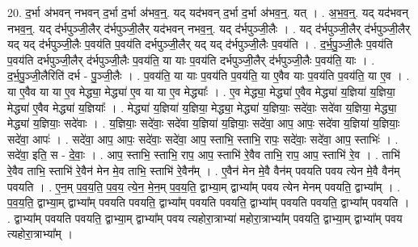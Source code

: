\documentclass[17pt]{extarticle}
\begin{document}
20. द॒र्भा अ॑भवन् नभवन् द॒र्भा द॒र्भा अ॑भव॒न्॒. यद् यद॑भवन् द॒र्भा द॒र्भा अ॑भव॒न्॒. यत् । . अ॒भ॒व॒न्॒. यद् यद॑भवन् नभव॒न्॒. यद् द॑र्भपुञ्जी॒लैर् द॑र्भपुञ्जी॒लैर् यद॑भवन् नभव॒न्॒. यद् द॑र्भपुञ्जी॒लैः । . यद् द॑र्भपुञ्जी॒लैर् द॑र्भपुञ्जी॒लैर् यद् यद् द॑र्भपुञ्जी॒लैः प॒वय॑ति प॒वय॑ति दर्भपुञ्जी॒लैर् यद् यद् द॑र्भपुञ्जी॒लैः प॒वय॑ति । . द॒र्भ॒पु॒ञ्जी॒लैः प॒वय॑ति प॒वय॑ति दर्भपुञ्जी॒लैर् द॑र्भपुञ्जी॒लैः प॒वय॑ति॒ या याः प॒वय॑ति दर्भपुञ्जी॒लैर् द॑र्भपुञ्जी॒लैः प॒वय॑ति॒ याः । . द॒र्भ॒पु॒ञ्जी॒लैरिति॑ दर्भ - पु॒ञ्जी॒लैः । . प॒वय॑ति॒ या याः प॒वय॑ति प॒वय॑ति॒ या ए॒वैव याः प॒वय॑ति प॒वय॑ति॒ या ए॒व । . या ए॒वैव या या ए॒व मेद्ध्या॒ मेद्ध्या॑ ए॒व या या ए॒व मेद्ध्याः᳚ । . ए॒व मेद्ध्या॒ मेद्ध्या॑ ए॒वैव मेद्ध्या॑ य॒ज्ञिया॑ य॒ज्ञिया॒ मेद्ध्या॑ ए॒वैव मेद्ध्या॑ य॒ज्ञियाः᳚ । . मेद्ध्या॑ य॒ज्ञिया॑ य॒ज्ञिया॒ मेद्ध्या॒ मेद्ध्या॑ य॒ज्ञियाः॒ सदे॑वाः॒ सदे॑वा य॒ज्ञिया॒ मेद्ध्या॒ मेद्ध्या॑ य॒ज्ञियाः॒ सदे॑वाः । . य॒ज्ञियाः॒ सदे॑वाः॒ सदे॑वा य॒ज्ञिया॑ य॒ज्ञियाः॒ सदे॑वा॒ आप॒ आपः॒ सदे॑वा य॒ज्ञिया॑ य॒ज्ञियाः॒ सदे॑वा॒ आपः॑ । . सदे॑वा॒ आप॒ आपः॒ सदे॑वाः॒ सदे॑वा॒ आप॒ स्ताभि॒ स्ताभि॒ रापः॒ सदे॑वाः॒ सदे॑वा॒ आप॒ स्ताभिः॑ । . सदे॑वा॒ इति॒ स - दे॒वाः॒ । . आप॒ स्ताभि॒ स्ताभि॒ राप॒ आप॒ स्ताभि॑ रे॒वैव ताभि॒ राप॒ आप॒ स्ताभि॑ रे॒व । . ताभि॑ रे॒वैव ताभि॒ स्ताभि॑ रे॒वैन॑ मेन मे॒व ताभि॒ स्ताभि॑ रे॒वैन᳚म् । . ए॒वैन॑ मेन मे॒वै वैन॑म् पवयति पवय त्येन मे॒वै वैन॑म् पवयति । . ए॒न॒म् प॒व॒य॒ति॒ प॒व॒य॒ त्ये॒न॒ मे॒न॒म् प॒व॒य॒ति॒ द्वाभ्या॒म् द्वाभ्या᳚म् पवय त्येन मेनम् पवयति॒ द्वाभ्या᳚म् । . प॒व॒य॒ति॒ द्वाभ्या॒म् द्वाभ्या᳚म् पवयति पवयति॒ द्वाभ्या᳚म् पवयति पवयति॒ द्वाभ्या᳚म् पवयति पवयति॒ द्वाभ्या᳚म् पवयति । . द्वाभ्या᳚म् पवयति पवयति॒ द्वाभ्या॒म् द्वाभ्या᳚म् पवय त्यहोरा॒त्राभ्या॑ महोरा॒त्राभ्या᳚म् पवयति॒ द्वाभ्या॒म् द्वाभ्या᳚म् पवय त्यहोरा॒त्राभ्या᳚म् । \newline
\end{document}
